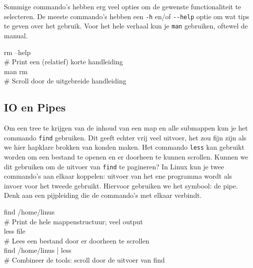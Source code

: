 Sommige commando's hebben erg veel opties om de gewenste functionaliteit te selecteren. De meeste commando's hebben een \texttt{-h} en/of \texttt{-\/-help} optie om wat tips te geven over het gebruik. Voor het hele verhaal kun je \texttt{man} gebruiken, oftewel de manual.

\begin{bash}
\userprompt[~] rm --help\\
\# Print een (relatief) korte handleiding\\

\userprompt[~] man rm\\
\# Scroll door de uitgebreide handleiding\\
\end{bash}

\subsection{IO en Pipes}\label{io-en-pipes}

Om een tree te krijgen van de inhoud van een map en alle submappen kun je het commando \texttt{find} gebruiken. Dit geeft echter vrij veel uitvoer, het zou fijn zijn als we hier hapklare brokken van konden maken. Het commando \texttt{less} kan gebruikt worden om een bestand te openen en er doorheen te kunnen scrollen. Kunnen we dit gebruiken om de uitvoer van \texttt{find} te pagineren? In Linux kun je twee commando's aan elkaar koppelen: uitvoer van het ene programma wordt als invoer voor het tweede gebruikt. Hiervoor gebruiken we het \texttt{\textbar{}} symbool: de pipe. Denk aan een pijpleiding die de commando's met elkaar verbindt.

\begin{bash}
\userprompt[~] find /home/linus\\
\# Print de hele mappenstructuur; veel output\\

\userprompt[~] less file\\
\# Lees een bestand door er doorheen te scrollen\\

\userprompt[~] find /home/linus | less\\
\# Combineer de tools: scroll door de uitvoer van find\\
\end{bash}


